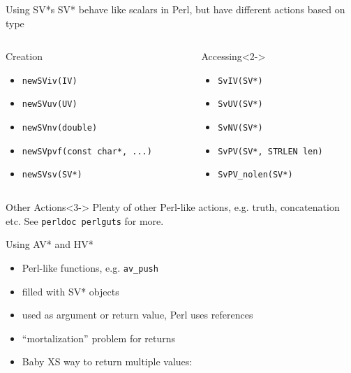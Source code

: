 \documentclass{beamer}
\begin{document}
\begin{frame}[fragile]{Using SV*s}
  SV* behave like scalars in Perl, but have different actions based on type
  \begin{columns}
    \begin{column}{0.54\linewidth}
      \begin{block}{Creation}
        \begin{itemize}
          \item \verb!newSViv(IV)!
          \item \verb!newSVuv(UV)!
          \item \verb!newSVnv(double)!
          \item \verb!newSVpvf(const char*, ...)!
          \item \verb!newSVsv(SV*)!
        \end{itemize}
      \end{block}
    \end{column}
    \begin{column}{0.44\linewidth}
      \begin{block}{Accessing}<2->
        \begin{itemize}
          \item \verb!SvIV(SV*)!
          \item \verb!SvUV(SV*)!
          \item \verb!SvNV(SV*)!
          \item \verb!SvPV(SV*, STRLEN len)!
          \item \verb!SvPV_nolen(SV*)!
        \end{itemize}
      \end{block}
    \end{column}
  \end{columns}
  \begin{block}{Other Actions}<3->
    Plenty of other Perl-like actions, e.g. truth, concatenation etc. See \verb!perldoc perlguts! for more.
  \end{block}
\end{frame}

\begin{frame}[fragile]{Using AV* and HV*}
  \begin{itemize}
    \item Perl-like functions, e.g. \verb!av_push!
    \item filled with SV* objects
    \item used as argument or return value, Perl uses references
    \item ``mortalization'' problem for returns
    \item Baby XS way to return multiple values:
  \end{itemize}
  \vfill
  \begin{block}{}
    \scriptsize
    
  \end{block}
\end{frame}
\end{document}
